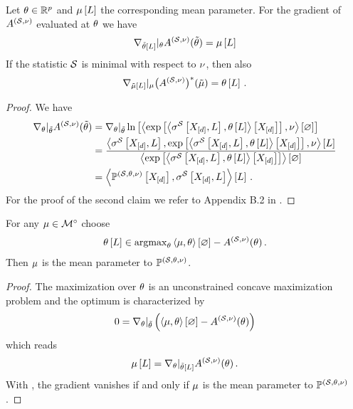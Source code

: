 \begin{lemma}
    \label{lem:gradientCumfunction}
    Let $\theta\in\mathbb{R}^{p}$ and $\mu\left[L\right]$ the corresponding mean parameter.
    For the gradient of $A^{(\mathcal{S},\nu)}$ evaluated at $\theta$ we have
    \begin{align*}
        \nabla_{\tilde{\theta}\left[L\right]}|_{\theta} A^{(\mathcal{S},\nu)}(\tilde{\theta}) = \mu\left[L\right]
    \end{align*}
    If the statistic $\mathcal{S}$ is minimal with respect to $\nu$, then also
    \begin{align*}
        \nabla_{\tilde{\mu}\left[L\right]}|_{\mu} \big(A^{(\mathcal{S},\nu)}\big)^*(\tilde{\mu})
        = \theta\left[L\right] \, .
    \end{align*}
\end{lemma}
\begin{proof}
    We have
    \begin{align*}
        \nabla_{\theta}|_{\tilde{\theta}} A^{(\mathcal{S},\nu)}(\tilde{\theta})
        & = \nabla_{\theta}|_{\tilde{\theta}} \ln \left[ \left\langle \mathrm{exp}\left[\left\langle \sigma^{\mathcal{S}}\left[X_{[d]},L\right],\theta\left[L\right]\right\rangle \left[ X_{[d]} \right]\right],\nu\right\rangle \left[ \varnothing \right] \right] \\
        & = \frac{
            \left\langle \sigma^{\mathcal{S}}\left[X_{[d]},L\right],\mathrm{exp}\left[\left\langle \sigma^{\mathcal{S}}\left[X_{[d]},L\right],\theta\left[L\right]\right\rangle \left[ X_{[d]} \right]\right],\nu\right\rangle \left[ L \right]
            }{\left\langle \mathrm{exp}\left[\left\langle \sigma^{\mathcal{S}}\left[X_{[d]},L\right],\theta\left[L\right]\right\rangle \left[ X_{[d]} \right]\right]\right\rangle \left[ \varnothing \right]}  \\
        & = \left\langle \mathbb{P}^{(\mathcal{S},\theta,\nu)}\left[X_{[d]}\right],\sigma^{\mathcal{S}}\left[X_{[d]},L\right]\right\rangle \left[ L \right] \, .
    \end{align*}
    For the proof of the second claim we refer to Appendix B.2 in \cite{wainwright_graphical_2008}.
\end{proof}

\begin{theorem}
    For any $\mu\in{\mathcal{M}}^{\circ}$ choose
    \begin{align*}
        \theta\left[L\right] \in \mathrm{argmax}_{\theta} \left\langle \mu,\theta\right\rangle \left[ \varnothing \right] - A^{(\mathcal{S},\nu)}(\theta) \, .
    \end{align*}
    Then $\mu$ is the mean parameter to $\mathbb{P}^{(\mathcal{S},\theta,\nu)}$.
\end{theorem}
\begin{proof}
    The maximization over $\theta$ is an unconstrained concave maximization problem and the optimum is characterized by
    \begin{align*}
        0 = \nabla_{\theta}|_{\tilde{\theta}}\left(\left\langle \mu,\theta\right\rangle \left[ \varnothing \right] - A^{(\mathcal{S},\nu)}(\theta)\right)
    \end{align*}
    which reads
    \begin{align*}
        \mu\left[L\right] = \nabla_{\theta}|_{\tilde{\theta}[L]} A^{(\mathcal{S},\nu)}(\theta) \, .
    \end{align*}
    With , the gradient vanishes if and only if $\mu$ is the mean parameter to $\mathbb{P}^{(\mathcal{S},\theta,\nu)}$.
\end{proof}

